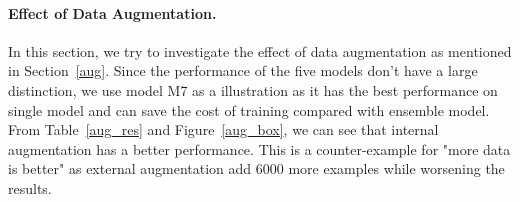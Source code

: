 \documentclass{article}
\begin{document}
\paragraph{Effect of Data Augmentation. } \label{aug_survey}
In this section, we try to investigate the effect of data augmentation as mentioned in Section~\ref{aug}. Since the performance of the five models don't have a large distinction, we use model M7 as a illustration as it has the best performance on single model and can save the cost of training compared with ensemble model. From Table~\ref{aug_res} and Figure~\ref{aug_box}, we can see that internal augmentation has a better performance. This is a counter-example for "more data is better" as external augmentation add 6000 more examples while worsening the results. 


\end{document}
